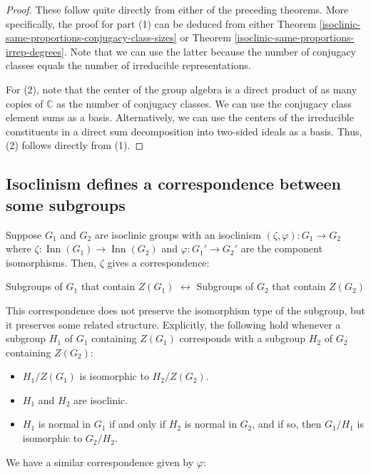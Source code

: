 \begin{proof}
  These follow quite directly from either of the preceding
  theorems. More specifically, the proof for part (1) can be deduced
  from either Theorem
  \ref{isoclinic-same-proportions-conjugacy-class-sizes} or Theorem
  \ref{isoclinic-same-proportions-irrep-degrees}. Note that we can use
  the latter because the number of conjugacy classes equals the number
  of irreducible representations.

  For (2), note that the center of the group algebra is a direct
  product of as many copies of $\mathbb{C}$ as the number of conjugacy
  classes. We can use the conjugacy class element sums as a
  basis. Alternatively, we can use the centers of the irreducible
  constituents in a direct sum decomposition into two-sided ideals as
  a basis. Thus, (2) follows directly from (1).
\end{proof}

\subsection{Isoclinism defines a correspondence between some subgroups}\label{sec:isoclinism-correspondence-some-subgroups}

Suppose $G_1$ and $G_2$ are isoclinic groups with an isoclinism
$(\zeta,\varphi): G_1 \to G_2$ where $\zeta:\operatorname{Inn}(G_1)
\to \operatorname{Inn}(G_2)$ and $\varphi:G_1' \to G_2'$ are the
component isomorphisms. Then, $\zeta$ gives a correspondence:

\begin{center}
Subgroups of $G_1$ that contain $Z(G_1)$ $\leftrightarrow$ Subgroups
of $G_2$ that contain $Z(G_2)$
\end{center}
This correspondence does not preserve the isomorphism type of the
subgroup, but it preserves some related structure. Explicitly, the
following hold whenever a subgroup $H_1$ of $G_1$ containing $Z(G_1)$
corresponds with a subgroup $H_2$ of $G_2$ containing $Z(G_2)$:

\begin{itemize}
\item $H_1/Z(G_1)$ is isomorphic to $H_2/Z(G_2)$.
\item $H_1$ and $H_2$ are isoclinic.
\item $H_1$ is normal in $G_1$ if and only if $H_2$ is normal in
  $G_2$, and if so, then $G_1/H_1$ is isomorphic to $G_2/H_2$.
\end{itemize}

We have a similar correspondence given by $\varphi$:

